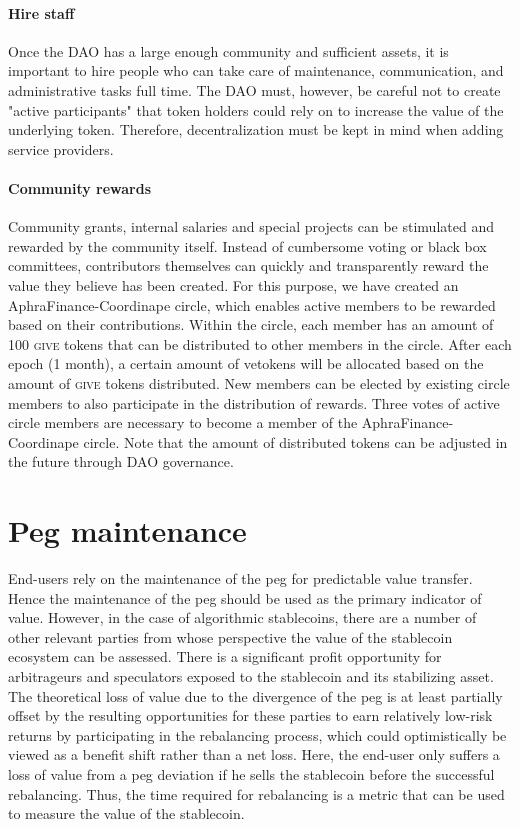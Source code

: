 \paragraph{\textbf{Hire staff}}
Once the DAO has a large enough community and sufficient assets, it is important to hire people who can take care of maintenance, communication, and administrative tasks full time.
The DAO must, however, be careful not to create "active participants" that token holders could rely on to increase the value of the underlying token. 
Therefore, decentralization must be kept in mind when adding service providers. 

\paragraph{\textbf{Community rewards}}
Community grants, internal salaries and special projects can be stimulated and rewarded by the community itself. 
Instead of cumbersome voting or black box committees, contributors themselves can quickly and transparently reward the value they believe has been created.
For this purpose, we have created an AphraFinance-Coordinape circle,\cite{coordinape} which enables active members to be rewarded based on their contributions.
Within the circle, each member has an amount of 100 \textsc{give} tokens that can be distributed to other members in the circle.
After each epoch (1 month), a certain amount of ve\aphra tokens will be allocated based on the amount of \textsc{give} tokens distributed.
New members can be elected by existing circle members to also participate in the distribution of rewards.
Three votes of active circle members are necessary to become a member of the AphraFinance-Coordinape circle.
Note that the amount of distributed \aphra tokens can be adjusted in the future through DAO governance.

\section{Peg maintenance}
\label{sec:peg_maintenance}
End-users rely on the maintenance of the peg for predictable value transfer. 
Hence the maintenance of the peg should be used as the primary indicator of value.
However, in the case of algorithmic stablecoins, there are a number of other relevant parties from whose perspective the value of the stablecoin ecosystem can be assessed.
There is a significant profit opportunity for arbitrageurs and speculators exposed to the stablecoin and its stabilizing asset.
The theoretical loss of value due to the divergence of the peg is at least partially offset by the resulting opportunities for these parties to earn relatively low-risk returns by participating in the rebalancing process, which could optimistically be viewed as a benefit shift rather than a net loss.
Here, the end-user only suffers a loss of value from a peg deviation if he sells the stablecoin before the successful rebalancing.
Thus, the time required for rebalancing is a metric that can be used to measure the value of the stablecoin.\\[-1em]

